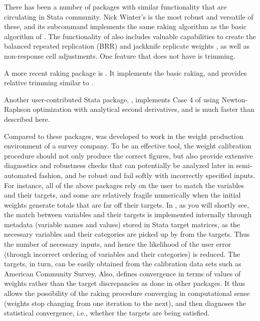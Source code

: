 There has been a number of packages with similar functionality
that are circulating in Stata community. Nick Winter's 
\citep{winter:2002}
is the most robust and versatile of these, and its 
subcommand implements the same raking algorithm as the basic algorithm
of . The functionality of  also includes
valuable capabilities to create the balanced repeated replication (BRR) 
and jackknife replicate weights
\citep{kolenikov:2010}, as well as non-response cell adjustments.
One feature that  does not have is trimming.

A more recent raking package is  \citep{bergmann:2011}.
It implements the basic raking, and provides relative trimming similar
to .

Another user-contributed Stata package, 
\citep{wittenberg:2010}, implements Case 4 of \citet{deville:sarndal:1992} using
Newton-Raphson optimization with analytical second derivatives,
and is much faster than  described here.

Compared to these packages,  was developed to work in
the weight production environment of a survey company. To be an effective tool,
the weight calibration procedure should not only produce the correct figures,
but also provide extensive diagnostics and robustness checks that can potentially
be analyzed later in semi-automated fashion, and be robust and fail softly with
incorrectly specified inputs. For instance, all of the above packages rely on the user
to match the variables and their targets, and some are relatively fragile numerically
when the initial weights generate totals that are far off their targets.
In , as you will shortly see, the match between variables 
and their targets is implemented internally through metadata
(variable names and values) stored in Stata target matrices, as the necessary
variables and their categories are picked up by  from the targets.
Thus the number of necessary inputs, and hence the likelihood of the user error
(through incorrect ordering of variables and their categories) is reduced.
The targets, in turn, can be easily obtained from the calibration data sets
such as American Community Survey. Also,  defines convergence in
terms of values of weights rather than the target discrepancies as done in other
packages. It thus allows the possibility of the raking procedure converging
in computational sense (weights stop changing from one iteration to the next),
and then diagnoses the statistical convergence, i.e., whether the targets
are being satisfied.


